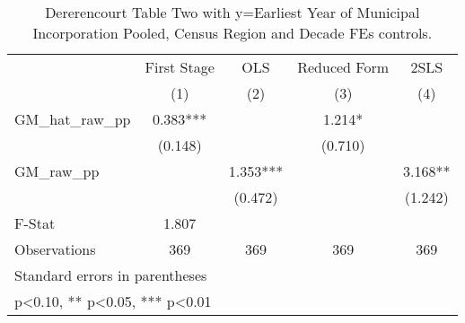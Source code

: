 \begin{table}[htbp]\centering
\def\sym#1{\ifmmode^{#1}\else\(^{#1}\)\fi}
\caption{Dererencourt Table Two with y=Earliest Year of Municipal Incorporation  Pooled, Census Region and Decade FEs controls.}
\begin{tabular}{l*{4}{c}}
\toprule
                    & First Stage   &         OLS   &Reduced Form   &        2SLS   \\
                    &\multicolumn{1}{c}{(1)}   &\multicolumn{1}{c}{(2)}   &\multicolumn{1}{c}{(3)}   &\multicolumn{1}{c}{(4)}   \\
\midrule
GM\_hat\_raw\_pp       &       0.383***&               &       1.214*  &               \\
                    &     (0.148)   &               &     (0.710)   &               \\
\addlinespace
GM\_raw\_pp           &               &       1.353***&               &       3.168** \\
                    &               &     (0.472)   &               &     (1.242)   \\
\midrule
F-Stat              &       1.807   &               &               &               \\
Observations        &         369   &         369   &         369   &         369   \\
\bottomrule
\multicolumn{5}{l}{\footnotesize Standard errors in parentheses}\\
\multicolumn{5}{l}{\footnotesize * p<0.10, ** p<0.05, *** p<0.01}\\
\end{tabular}
\end{table}
